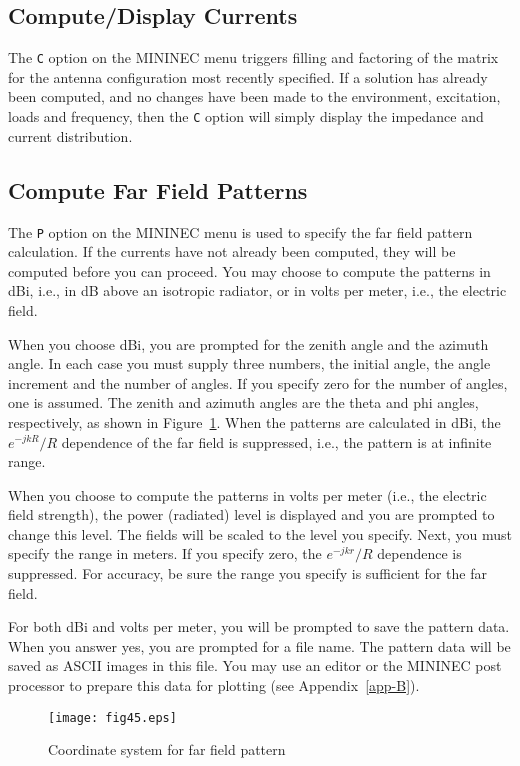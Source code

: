 \documentclass[12pt]{article}
\begin{document}
\subsection{Compute/Display Currents}
The \verb+C+ option on the MININEC menu triggers filling and factoring
of the matrix for the antenna configuration most recently specified. If
a solution has already been computed, and no changes have been made to
the environment, excitation, loads and frequency, then the \verb+C+
option will simply display the impedance and current distribution.

\subsection{Compute Far Field Patterns}
The \verb+P+ option on the MININEC menu is used to specify the far field
pattern calculation. If the currents have not already been computed,
they will be computed before you can proceed. You may choose to compute
the patterns in dBi, i.e., in dB above an isotropic radiator, or in
volts per meter, i.e., the electric field.

When you choose dBi, you are prompted for the zenith angle and the
azimuth angle. In each case you must supply three numbers, the initial
angle, the angle increment and the number of angles. If you specify zero
for the number of angles, one is assumed. The zenith and azimuth angles
are the theta and phi angles, respectively, as shown in Figure~\ref{fig45}.
When the patterns are calculated in dBi, the $e^{-jkR}/R$ dependence of
the far field is suppressed, i.e., the pattern is at infinite range.

When you choose to compute the patterns in volts per meter (i.e., the
electric field strength), the power (radiated) level is displayed and
you are prompted to change this level. The fields will be scaled to the
level you specify. Next, you must specify the range in meters. If you
specify zero, the $e^{-jkr}/R$ dependence is suppressed. For accuracy,
be sure the range you specify is sufficient for the far field.

For both dBi and volts per meter, you will be prompted to save the
pattern data. When you answer yes, you are prompted for a file name. The
pattern data will be saved as ASCII images in this file. You may use an
editor or the MININEC post processor to prepare this data for plotting
(see Appendix~\ref{app-B}).

\begin{figure}[htb]
\centerline{\texttt{[image: fig45.eps]}}
\caption{Coordinate system for far field pattern}
\label{fig45}
\end{figure}
\end{document}
